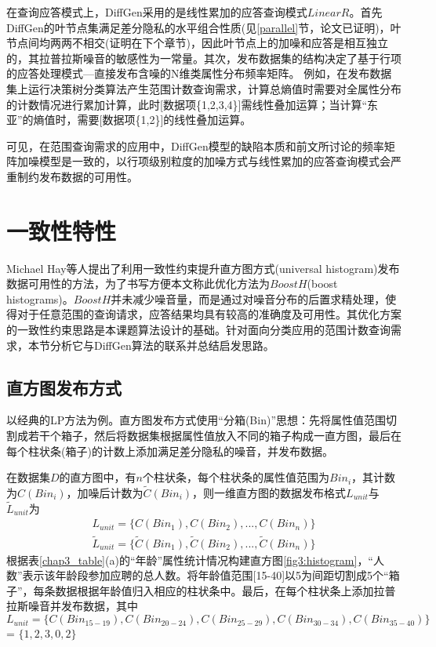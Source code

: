 在查询应答模式上，DiffGen采用的是线性累加的应答查询模式$LinearR$。首先DiffGen的叶节点集满足差分隐私的水平组合性质(见\ref{parallel}节，论文\parencite{DiffGen}已证明)，叶节点间均两两不相交(证明在下个章节)，因此叶节点上的加噪和应答是相互独立的，其拉普拉斯噪音的敏感性为一常量。其次，发布数据集的结构决定了基于行项的应答处理模式---直接发布含噪的N维类属性分布频率矩阵。
例如，在发布数据集上运行决策树分类算法产生范围计数查询需求，计算总熵值时需要对全属性分布的计数情况进行累加计算，此时[数据项\{1,2,3,4\}]需线性叠加运算；当计算“东亚”的熵值时，需要[数据项\{1,2\}]的线性叠加运算。

可见，在范围查询需求的应用中，DiffGen模型的缺陷本质和前文所讨论的频率矩阵加噪模型是一致的，以行项级别粒度的加噪方式与线性累加的应答查询模式会严重制约发布数据的可用性。


\section{一致性特性}

Michael Hay等人提出了利用一致性约束提升直方图方式(universal histogram)发布数据可用性的方法\supercite{boosting}，为了书写方便本文称此优化方法为$BoostH$(boost histograms)。$BoostH$并未减少噪音量，而是通过对噪音分布的后置求精处理，使得对于任意范围的查询请求，应答结果均具有较高的准确度及可用性。其优化方案的一致性约束思路是本课题算法设计的基础。针对面向分类应用的范围计数查询需求，本节分析它与DiffGen算法的联系并总结启发思路。

\subsection{直方图发布方式}  %

以经典的LP\supercite{Dwork Calibrating}方法为例。直方图发布方式使用“分箱(Bin)”思想：先将属性值范围切割成若干个箱子，然后将数据集根据属性值放入不同的箱子构成一直方图，最后在每个柱状条(箱子)的计数上添加满足差分隐私的噪音，并发布数据。

在数据集$D$的直方图中，有$n$个柱状条，每个柱状条的属性值范围为$Bin_{i}$，其计数为$C(Bin_{i})$，加噪后计数为$\tilde{C}(Bin_{i})$，则一维直方图的数据发布格式$L_{unit}$与$\tilde{L}_{unit}$为
\[
\begin{split}
	L_{unit} = \{C(Bin_{1}),C(Bin_{2}),...,C(Bin_{n})\}\\
	\tilde{L}_{unit} = \{\tilde{C}(Bin_{1}),\tilde{C}(Bin_{2}),...,\tilde{C}(Bin_{n})\}	
\end{split}
\]
根据表\ref{chap3_table}(a)的“年龄”属性统计情况构建直方图\ref{fig3:histogram}，“人数”表示该年龄段参加应聘的总人数。将年龄值范围[15-40]以5为间距切割成5个“箱子”，每条数据根据年龄值归入相应的柱状条中。最后，在每个柱状条上添加拉普拉斯噪音并发布数据，其中$L_{unit} = \{C(Bin_{15-19}),C(Bin_{20-24}),C(Bin_{25-29}),C(Bin_{30-34}),C(Bin_{35-40})\}$ = $\{1,2,3,0,2\}$%

